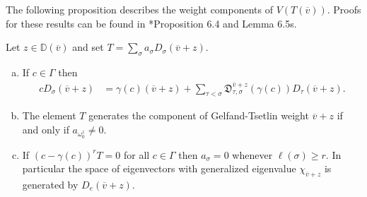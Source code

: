 \documentclass[11pt,fleqn]{amsart}
\newcommand\vv{\overline{v}}
\newcommand\DD{\mathbb D}
\newcommand\D{\mathfrak D}
\begin{document}
The following proposition describes the weight components of $V(T(\vv))$. 
Proofs for these results can be found in \cite{FGRZ18}*{Proposition 6.4 and
Lemma 6.5s}.
\begin{Proposition}
Let $z \in \DD(\vv)$ and set $T = \sum_\sigma a_\sigma D_\sigma(\vv + z)$.
\begin{enumerate}[(a)]
\item If $c \in \Gamma$ then
\begin{align*}
c D_\sigma(\vv + z)
	&= \gamma(c)(\vv+z) +
		\sum_{\tau < \sigma} \D_{\tau,\sigma}^{\vv + z}(\gamma(c)) 
			D_\tau(\vv+z).
\end{align*}

\item The element $T$ generates the component of Gelfand-Tsetlin weight $\vv+z$
if and only if $a_{\omega_0^z} \neq 0$.

\item If $(c - \gamma(c))^r T = 0$ for all $c \in \Gamma$ then $a_\sigma = 0$
whenever $\ell(\sigma) \geq r$. In particular the space of eigenvectors with
generalized eigenvalue $\chi_{\vv + z}$ is generated by $D_e(\vv + z)$.
\end{enumerate}
\end{Proposition}

\begin{bibdiv}
\begin{biblist}
\end{biblist}
\end{bibdiv}
\end{document}
